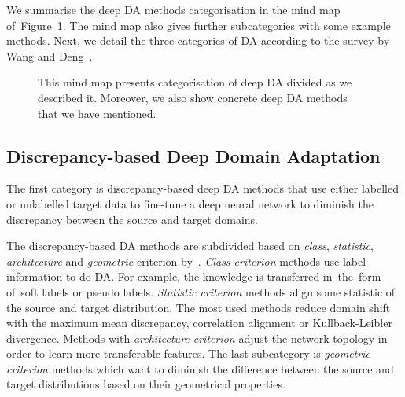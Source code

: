 We summarise the deep DA methods categorisation in the mind map of~Figure~\ref{mind_map}.
The mind map also gives further subcategories with some example methods.
Next, we detail the three categories of DA according to the survey by Wang and Deng~\cite{wang2018}.

\begin{figure}
\caption[Mind map of deep domain adaptation]{
	This mind map presents categorisation of deep DA divided as we described it.
	Moreover, we also show concrete deep DA methods
	that we have mentioned.
}
\label{mind_map}
\end{figure}

\subsection{Discrepancy-based Deep Domain Adaptation}
\label{discrepancy_da}

The first category is discrepancy-based deep DA methods
that use either labelled or unlabelled target data
to fine-tune a deep neural network to diminish the discrepancy
between the source and target domains.

The discrepancy-based DA methods are subdivided based on \textit{class}, \textit{statistic}, \textit{architecture} and \textit{geometric} criterion by~\cite{wang2018}.
\textit{Class criterion} methods use label information to do DA.
For example, the knowledge is transferred in~the~form of~soft labels or pseudo labels.
\textit{Statistic criterion} methods align some statistic of the source and target distribution.
The most used methods reduce domain shift with the maximum mean discrepancy, correlation alignment or Kullback-Leibler divergence.
Methods with \textit{architecture criterion} adjust the network topology in order to learn more transferable features.
The last subcategory is \textit{geometric criterion} methods
which want to diminish the difference between the source and target distributions based on their geometrical properties.

